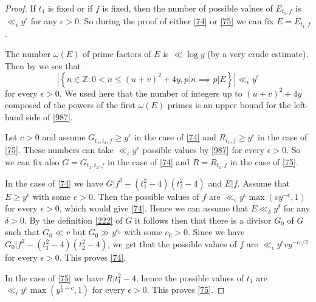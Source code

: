 \documentclass[12pt]{amsart}
\theoremstyle{definition}
\numberwithin{equation}{section}
\begin{document}
\begin{proof}If $t_1$ is fixed or if $f$ is fixed, then the number of
possible values of $E_{t_1,f}$ is  $\ll_{\epsilon}y^{\epsilon}$ for any $
\epsilon >0$. So during the proof of
either \eqref{74} or \eqref{75} we can fix $E=E_{t_1,f}$.

The number $\omega\left(E\right)$ of prime factors of $E$ is $\ll\log
y$ (by a very
crude estimate). Then by \cite[(1.14)]{Granville} we see that
\begin{equation}\left|\left\{n\in\mathbb{Z}:0<n\le\left(u+v\right
)^2+4y,p|n\implies p|E\right\}\right|\ll_{\epsilon}y^{\epsilon}\label{987}\end{equation}
for every $\epsilon >0$. We used here that the number of integers
up to $\left(u+v\right)^2+4y$ composed of
the powers of the first $\omega\left(E\right)$ primes is an upper
bound for the left-hand side of \eqref{987}.

Let $c>0$ and assume $G_{t_1,t_2,f}\ge y^c$ in the case of
\eqref{74} and $R_{t_1,f}\ge y^c$ in the case of \eqref{75}. These
numbers can take $\ll_{\epsilon}y^{\epsilon}$ possible values by \eqref{987}
for every $\epsilon >0$. So we can fix also $G=G_{t_1,t_2,f}$ in the case of
\eqref{74} and $R=R_{t_1,f}$ in the case of \eqref{75}.

In the case of \eqref{74} we have $G|f^2-\left(t_1^2-4\right)\left
(t_2^2-4\right)$
and $E|f$. Assume that $E\ge y^e$ with some $e>0$. Then the
possible values of $f$ are $\ll_{\epsilon}y^{\epsilon}\max\left(v
y^{-e},1\right)$ for every
$\epsilon >0$, which would give \eqref{74}. Hence we can assume
that $E\ll_{\delta}y^{\delta}$ for any $\delta >0$. By the definition \eqref{222}
of $G$ it follows then that there is a divisor $G_0$ of $G$
such that $G_0\ll v$ but $G_0\gg y^{c_0}$ with some $c_0>0$. Since
we have $G_0|f^2-\left(t_1^2-4\right)\left(t_2^2-4\right)$, we get that the possible
values of $f$ are $\ll_{\epsilon}y^{\epsilon}vy^{-c_0/2}$ for every $
\epsilon >0$. This proves \eqref{74}.

In the case of \eqref{75} we have $R|t_1^2-4$, hence
the possible values of $t_1$ are $\ll_{\epsilon}y^{\epsilon}\max\left
(y^{\frac 12-c},1\right)$ for every
$\epsilon >0$. This proves \eqref{75}.
\end{proof}
\end{document}
